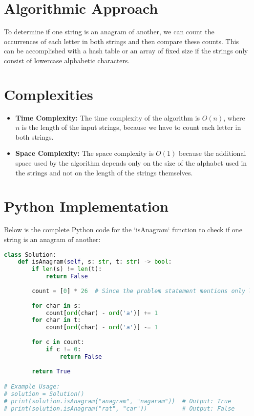 \section*{Algorithmic Approach}
To determine if one string is an anagram of another, we can count the occurrences of each letter in both strings and then compare these counts. This can be accomplished with a hash table or an array of fixed size if the strings only consist of lowercase alphabetic characters.

\section*{Complexities}

\begin{itemize}
    \item \textbf{Time Complexity:} The time complexity of the algorithm is \(O(n)\), where \(n\) is the length of the input strings, because we have to count each letter in both strings.
    \item \textbf{Space Complexity:} The space complexity is \(O(1)\) because the additional space used by the algorithm depends only on the size of the alphabet used in the strings and not on the length of the strings themselves.
\end{itemize}

\newpage %
\section*{Python Implementation}

Below is the complete Python code for the `isAnagram` function to check if one string is an anagram of another:

\begin{fullwidth}
\begin{lstlisting}[language=Python]
class Solution:
    def isAnagram(self, s: str, t: str) -> bool:
        if len(s) != len(t):
            return False
        
        count = [0] * 26  # Since the problem statement mentions only lowercase alphabets
        
        for char in s:  
            count[ord(char) - ord('a')] += 1
        for char in t:
            count[ord(char) - ord('a')] -= 1
        
        for c in count:
            if c != 0:
                return False
                
        return True

# Example Usage:
# solution = Solution()
# print(solution.isAnagram("anagram", "nagaram"))  # Output: True
# print(solution.isAnagram("rat", "car"))          # Output: False
\end{lstlisting}
\end{fullwidth}


